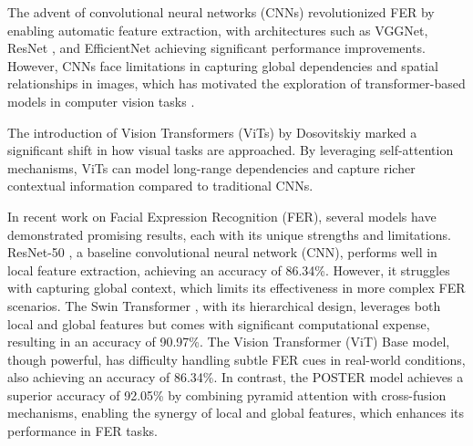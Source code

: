 The advent of convolutional neural networks (CNNs) revolutionized FER by enabling automatic feature extraction, with architectures such as VGGNet, ResNet \cite{he_deep_2015}, and EfficientNet achieving significant performance improvements. However, CNNs face limitations in capturing global dependencies and spatial relationships in images, which has motivated the exploration of transformer-based models in computer vision tasks \cite{islam_recent_2023}.

The introduction of Vision Transformers (ViTs) by Dosovitskiy \cite{dosovitskiy_image_2021} marked a significant shift in how visual tasks are approached. By leveraging self-attention mechanisms, ViTs can model long-range dependencies and capture richer contextual information compared to traditional CNNs.


In recent work on Facial Expression Recognition (FER), several models have demonstrated promising results, each with its unique strengths and limitations. ResNet-50 \cite{he_deep_2015} , a baseline convolutional neural network (CNN), performs well in local feature extraction, achieving an accuracy of 86.34\%. However, it struggles with capturing global context, which limits its effectiveness in more complex FER scenarios. The Swin Transformer \cite{liu_swin_2021}, with its hierarchical design, leverages both local and global features but comes with significant computational expense, resulting in an accuracy of 90.97\%. The Vision Transformer (ViT) Base \cite{dosovitskiy_image_2021} model, though powerful, has difficulty handling subtle FER cues in real-world conditions, also achieving an accuracy of 86.34\%. In contrast, the POSTER model \cite{zheng_poster_2022} achieves a superior accuracy of 92.05\% by combining pyramid attention with cross-fusion mechanisms, enabling the synergy of local and global features, which enhances its performance in FER tasks. 


